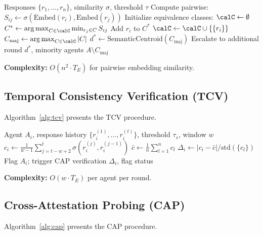\documentclass[journal,10pt]{IEEEtran}
\DeclareMathOperator*{\argmax}{arg\,max}
\begin{document}
\begin{algorithm}[t]
\caption{Semantic Voting with Equivalence Classes (SVEC)}
\label{alg:svec}
\begin{algorithmic}[1]
\REQUIRE Responses $\{r_1, \ldots, r_n\}$, similarity $\sigma$, threshold $\tau$
\STATE Compute pairwise: $S_{ij} \gets \sigma(\text{Embed}(r_i), \text{Embed}(r_j))$
\STATE Initialize equivalence classes: $\calC \gets \emptyset$
    \STATE $C^* \gets \argmax_{C \in \calC} \min_{r_j \in C} S_{ij}$
        \STATE Add $r_i$ to $C^*$
    \ELSE
        \STATE $\calC \gets \calC \cup \{\{r_i\}\}$
    \ENDIF
\ENDFOR
\STATE $C_{\text{maj}} \gets \argmax_{C \in \calC} |C|$
    \STATE $d^* \gets \text{SemanticCentroid}(C_{\text{maj}})$
\ELSE
    \STATE Escalate to additional round
\ENDIF
\RETURN $d^*$, minority agents $A \setminus C_{\text{maj}}$
\end{algorithmic}
\end{algorithm}

\textbf{Complexity:} $O(n^2 \cdot T_E)$ for pairwise embedding similarity.

\subsection{Temporal Consistency Verification (TCV)}
Algorithm~\ref{alg:tcv} presents the TCV procedure.

\begin{algorithm}[t]
\caption{Temporal Consistency Verification (TCV)}
\label{alg:tcv}
\begin{algorithmic}[1]
\REQUIRE Agent $A_i$, response history $\{r_i^{(1)}, \ldots, r_i^{(t)}\}$, threshold $\tau_s$, window $w$
\STATE $c_i \gets \frac{1}{w-1} \sum_{j=t-w+2}^{t} \sigma(r_i^{(j)}, r_i^{(j-1)})$
\STATE $\bar{c} \gets \frac{1}{n} \sum_{l=1}^{n} c_l$ \hfill{}
\STATE $\Delta_i \gets |c_i - \bar{c}| / \text{std}(\{c_l\})$ \hfill{}
    \STATE Flag $A_i$; trigger CAP verification
\ENDIF
\RETURN $\Delta_i$, flag status
\end{algorithmic}
\end{algorithm}

\textbf{Complexity:} $O(w \cdot T_E)$ per agent per round.

\subsection{Cross-Attestation Probing (CAP)}
Algorithm~\ref{alg:cap} presents the CAP procedure.
\end{document}
